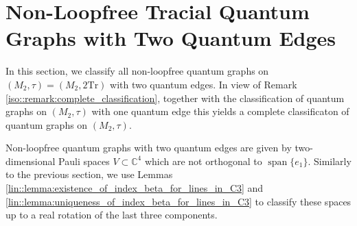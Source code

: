 \documentclass{amsart}
\newcommand{\C}{\mathbb{C}}
\DeclareMathOperator{\spann}{span}
\begin{document}
\section{Non-Loopfree Tracial Quantum Graphs with Two Quantum Edges}
\label{sec::t2e}

In this section, we classify all non-loopfree quantum graphs on $(M_2, \tau)=(M_2, 2 \mathrm{Tr})$ with two quantum edges. In view of Remark \ref{iso::remark:complete_classification}, together with the classification of quantum graphs on $(M_2, \tau)$ with one quantum edge this yields a complete classificaton of quantum graphs on $(M_2, \tau)$. 

Non-loopfree quantum graphs with two quantum edges are given by two-dimensional Pauli spaces $V \subset \C^4$ which are not orthogonal to $\spann\{e_1\}$. Similarly to the previous section, we use Lemmas \ref{lin::lemma:existence_of_index_beta_for_lines_in_C3} and \ref{lin::lemma:uniqueness_of_index_beta_for_lines_in_C3} to classify these spaces up to a real rotation of the last three components.
\end{document}
